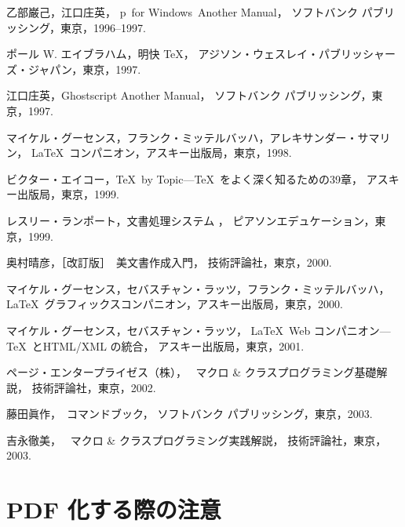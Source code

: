 \documentclass[technicalreport]{ieicej}
\begin{document}
\begin{thebibliography}{99}
乙部巌己，江口庄英，
p\LaTeXe\ for Windows\ Another Manual，
ソフトバンク パブリッシング，東京，1996--1997. 

ポール W. エイブラハム，明快 \TeX{}，
アジソン・ウェスレイ・パブリッシャーズ・ジャパン，東京，1997. 

江口庄英，Ghostscript Another Manual，
ソフトバンク パブリッシング，東京，1997. 

マイケル・グーセンス，フランク・ミッテルバッハ，アレキサンダー・サマリン，
\LaTeX\ コンパニオン，アスキー出版局，東京，1998. 

ビクター・エイコー，\TeX\ by Topic---\TeX\ をよく深く知るための39章，
アスキー出版局，東京，1999. 

レスリー・ランポート，文書処理システム \LaTeXe{}，
ピアソンエデュケーション，東京，1999. 

奥村晴彦，［改訂版］\LaTeXe\ 美文書作成入門，
技術評論社，東京，2000. 

マイケル・グーセンス，セバスチャン・ラッツ，フランク・ミッテルバッハ，
\LaTeX\ グラフィックスコンパニオン，アスキー出版局，東京，2000. 

マイケル・グーセンス，セバスチャン・ラッツ，
\LaTeX\ Web コンパニオン---\TeX\ とHTML/XML の統合，
アスキー出版局，東京，2001. 

ページ・エンタープライゼス\<（株）\<，
\LaTeXe\ マクロ \& クラスプログラミング基礎解説，
技術評論社，東京，2002. 

藤田眞作，\LaTeXe\ コマンドブック，
ソフトバンク パブリッシング，東京，2003. 

吉永徹美，
\LaTeXe\ マクロ \& クラスプログラミング実践解説，
技術評論社，東京，2003. 
\end{thebibliography}

\appendix
\label{sec:app}
\section{PDF 化する際の注意}
\end{document}
